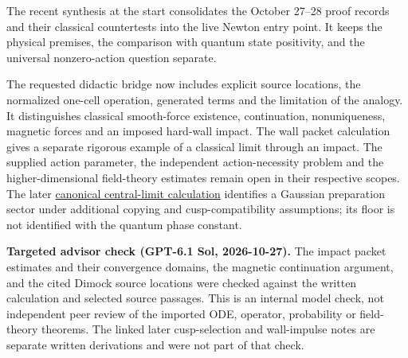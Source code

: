 \documentclass[11pt,a4paper]{article}
\begin{document}
The recent synthesis at the start consolidates the October 27--28 proof
records and their classical countertests into the live Newton entry
point. It keeps the physical premises, the comparison with quantum state
positivity, and the universal nonzero-action question separate.

The requested didactic bridge now includes explicit source locations,
the normalized one-cell operation, generated terms and the limitation of
the analogy. It distinguishes classical smooth-force existence,
continuation, nonuniqueness, magnetic forces and an imposed hard-wall
impact. The wall packet calculation gives a separate rigorous example of
a classical limit through an impact. The supplied action parameter, the
independent action-necessity problem and the higher-dimensional
field-theory estimates remain open in their respective scopes. The later
\href{central-limit-canonical-gaussian-sector.md}{canonical
central-limit calculation} identifies a Gaussian preparation sector
under additional copying and cusp-compatibility assumptions; its floor
is not identified with the quantum phase constant.

\textbf{Targeted advisor check (GPT-6.1 Sol, 2026-10-27).} The impact
packet estimates and their convergence domains, the magnetic
continuation argument, and the cited Dimock source locations were
checked against the written calculation and selected source passages.
This is an internal model check, not independent peer review of the
imported ODE, operator, probability or field-theory theorems. The linked
later cusp-selection and wall-impulse notes are separate written
derivations and were not part of that check.
\end{document}
